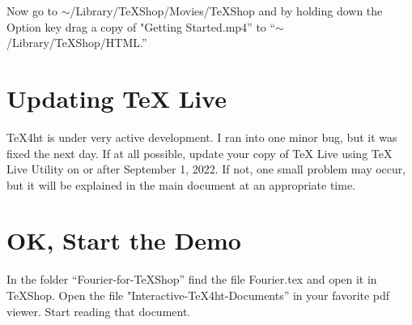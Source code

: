 \documentclass[11pt, oneside]{article}   	%
\begin{document}
Now go to $\sim$/Library/TeXShop/Movies/TeXShop and by holding down the Option key drag a copy of "Getting Started.mp4'' to ``$\sim$/Library/TeXShop/HTML.''

\section{Updating TeX Live}

TeX4ht is under very active development. I ran into one minor bug, but it was fixed the next day. If at all possible, update your copy  of TeX Live using TeX Live Utility on or after September 1, 2022. If not, one small problem may occur, but it will be explained in the main document at an appropriate time.


\section{OK, Start the Demo}

In the folder ``Fourier-for-TeXShop'' find the file Fourier.tex and open it in TeXShop. Open the file "Interactive-TeX4ht-Documents'' in your favorite pdf viewer. Start reading that document.
\end{document}
